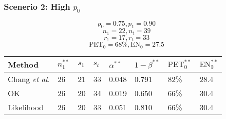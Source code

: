 \documentclass{beamer}\usepackage[]{graphicx}\usepackage[]{color}
\begin{document}
% 


\begin{frame}
\frametitle{Scenerio 2: High $p_0$}
$$p_0=0.75, p_1=0.90$$
$$n_1=22, n_t=39$$
$$r_1=17, r_t=33$$
$$\mbox{PET}_0 = 68\%, \mbox{EN}_0 = 27.5$$

\begin{table}[]
\begin{tabular}{llllllll}
Method                  & $n_1^{\ast\ast}$ & $s_1$ & $s_t$ & $\alpha^{\ast\ast}$ & $1-\beta^{\ast\ast}$ & $\mbox{PET}^{\ast\ast}_0$ & $\mbox{EN}^{\ast\ast}_0$ \\ \hline
Chang \textit{et al.}   & 26               & 21     & 33     & 0.048                                 & 0.791                & 82\%                      & 28.4                     \\
OK                      & 26               & 20     & 34     & 0.019                                 & 0.650                & 66\%                      & 30.4                     \\
Likelihood              & 26               & 20     & 33     & 0.051                                 & 0.810                & 66\%                      & 30.4                    
\end{tabular}
\end{table}
\end{frame}
\end{document}
